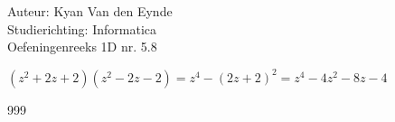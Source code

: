 \documentclass[a4paper]{article}
\begin{document}
  
\noindent \large Auteur: Kyan Van den Eynde \\
\noindent \large Studierichting: Informatica\\
\noindent \large Oefeningenreeks 1D nr. 5.8\\

\medskip

\normalsize

$(z^2+2z+2)(z^2-2z-2)=z^4-(2z+2)^2= z^4-4z^2-8z-4$

\begin{thebibliography}{999}
\end{thebibliography}
\end{document}
